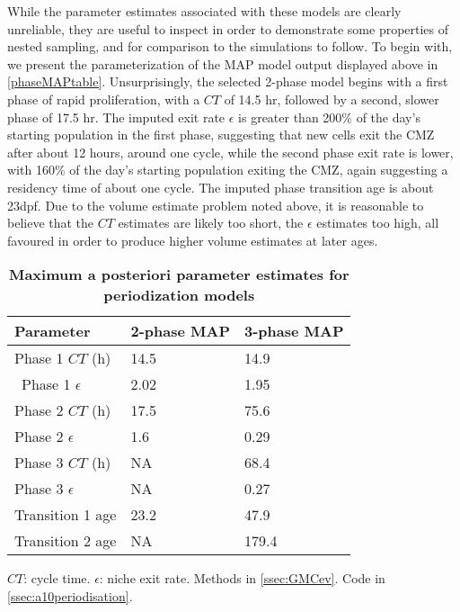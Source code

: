 While the parameter estimates associated with these models are clearly unreliable, they are useful to inspect in order to demonstrate some properties of nested sampling, and for comparison to the simulations to follow. To begin with, we present the parameterization of the MAP model output displayed above in \autoref{phaseMAPtable}. Unsurprisingly, the selected 2-phase model begins with a first phase of rapid proliferation, with a $CT$ of 14.5 hr, followed by a second, slower phase of 17.5 hr. The imputed exit rate $\epsilon$ is greater than 200\% of the day's starting population in the first phase, suggesting that new cells exit the CMZ after about 12 hours, around one cycle, while the second phase exit rate is lower, with 160\% of the day's starting population exiting the CMZ, again suggesting a residency time of about one cycle. The imputed phase transition age is about 23dpf. Due to the volume estimate problem noted above, it is reasonable to believe that the $CT$ estimates are likely too short, the $\epsilon$ estimates too high, all favoured in order to produce higher volume estimates at later ages.

\begin{table}[!ht]
    \centering
    \caption{{\bf Maximum a posteriori parameter estimates for periodization models}}
    \begin{tabular}{|l|l|l|}
        \hline
        {\bf Parameter} & {\bf 2-phase MAP} & {\bf 3-phase MAP}\\ \hline
        Phase 1 $CT$ (h) & 14.5 & 14.9\\ \hline\
        Phase 1 $\epsilon$ & 2.02 & 1.95\\ \hline
        Phase 2 $CT$ (h) & 17.5 & 75.6\\ \hline
        Phase 2 $\epsilon$ & 1.6 & 0.29\\ \hline
        Phase 3 $CT$ (h) & NA & 68.4\\ \hline
        Phase 3 $\epsilon$ & NA & 0.27\\ \hline
        Transition 1 age & 23.2 & 47.9\\ \hline
        Transition 2 age & NA & 179.4\\ \hline
    \end{tabular}
    \begin{flushleft}
        $CT$: cycle time.
        $\epsilon$: niche exit rate.
        Methods in \autoref{ssec:GMCev}.
        Code in \autoref{ssec:a10periodisation}.    
    \end{flushleft}
    \label{phaseMAPtable}
\end{table}

